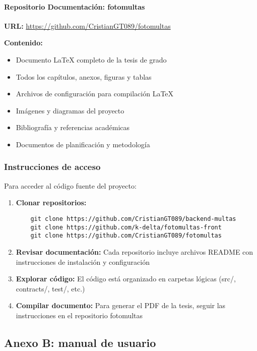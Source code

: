 \paragraph{Repositorio Documentación: fotomultas}
\textbf{URL:} \url{https://github.com/CristianGT089/fotomultas}

\textbf{Contenido:}
\begin{itemize}
    \item Documento LaTeX completo de la tesis de grado
    \item Todos los capítulos, anexos, figuras y tablas
    \item Archivos de configuración para compilación LaTeX
    \item Imágenes y diagramas del proyecto
    \item Bibliografía y referencias académicas
    \item Documentos de planificación y metodología
\end{itemize}

\subsubsection{Instrucciones de acceso}

Para acceder al código fuente del proyecto:

\begin{enumerate}
    \item \textbf{Clonar repositorios:}
    \begin{verbatim}
    git clone https://github.com/CristianGT089/backend-multas
    git clone https://github.com/k-delta/fotomultas-front
    git clone https://github.com/CristianGT089/fotomultas
    \end{verbatim}
    
    \item \textbf{Revisar documentación:} Cada repositorio incluye archivos README con instrucciones de instalación y configuración
    
    \item \textbf{Explorar código:} El código está organizado en carpetas lógicas (src/, contracts/, test/, etc.)
    
    \item \textbf{Compilar documento:} Para generar el PDF de la tesis, seguir las instrucciones en el repositorio fotomultas
\end{enumerate}

\subsection{Anexo B: manual de usuario}

